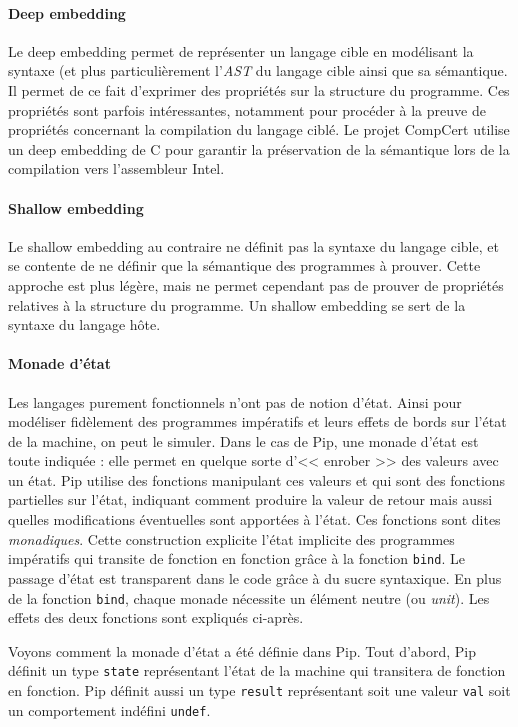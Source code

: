 				\paragraph{Deep embedding} Le deep embedding permet de représenter un langage cible en modélisant la syntaxe (et plus particulièrement l'\emph{AST} du langage cible ainsi que sa sémantique. Il permet de ce fait d'exprimer des propriétés sur la structure du programme. Ces propriétés sont parfois intéressantes, notamment pour procéder à la preuve de propriétés concernant la compilation du langage ciblé. Le projet CompCert utilise un deep embedding de C pour garantir la préservation de la sémantique lors de la compilation vers l'assembleur Intel.
				\paragraph{Shallow embedding} Le shallow embedding au contraire ne définit pas la syntaxe du langage cible, et se contente de ne définir que la sémantique des programmes à prouver. Cette approche est plus légère, mais ne permet cependant pas de prouver de propriétés relatives à la structure du programme. Un shallow embedding se sert de la syntaxe du langage hôte.

				\paragraph{Monade d'état} Les langages purement fonctionnels n'ont pas de notion d'état. Ainsi pour modéliser fidèlement des programmes impératifs et leurs effets de bords sur l'état de la machine, on peut le simuler. Dans le cas de Pip, une monade d'état est toute indiquée : elle permet en quelque sorte d'<< enrober >> des valeurs avec un état. Pip utilise des fonctions manipulant ces valeurs et qui sont des fonctions partielles sur l'état, indiquant comment produire la valeur de retour mais aussi quelles modifications éventuelles sont apportées à l'état. Ces fonctions sont dites \emph{monadiques}. Cette construction explicite l'état implicite des programmes impératifs qui transite de fonction en fonction grâce à la fonction \texttt{bind}. Le passage d'état est transparent dans le code grâce à du sucre syntaxique. En plus de la fonction \texttt{bind}, chaque monade nécessite un élément neutre (ou \emph{unit}). Les effets des deux fonctions sont expliqués ci-après.

				Voyons comment la monade d'état a été définie dans Pip. Tout d'abord, Pip définit un type \texttt{state} représentant l'état de la machine qui transitera de fonction en fonction. Pip définit aussi un type \texttt{result} représentant soit une valeur \texttt{val} soit un comportement indéfini \texttt{undef}.

